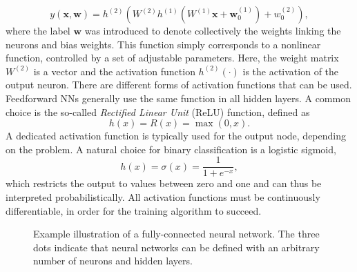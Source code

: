 \begin{equation}
    y(\pmb{x}, \pmb{w}) = h^{(2)} \left( W^{(2)} h^{(1)} \left(  W^{(1)} \pmb{x} + \pmb{w}^{(1)}_{0}    \right) + w^{(2)}_{0} \right),
\end{equation}
where the label $\pmb{w}$ was introduced to denote collectively the weights linking the neurons and bias weights.
This function simply corresponds to a nonlinear function, controlled by a set of adjustable parameters. Here, the weight matrix $W^{(2)}$ is a vector and the activation function $h^{(2)}(\cdot)$ is the activation of the output neuron.
There are different forms of activation functions that can be used.
Feedforward NNs generally use the same function in all hidden layers.
A common choice is the so-called \emph{Rectified Linear Unit} (ReLU) function, defined as
\begin{equation}
    {h(x)= R(x) = \max(0,x)}.    
\end{equation}
A dedicated activation function is typically used for the output node, depending on the problem.
A natural choice for binary classification is a logistic sigmoid,
\begin{equation}
    \label{eq:logistic-sigmoid}
    h(x)= \sigma(x) = {\frac {1}{1+e^{-x}}},
\end{equation}
which restricts the output to values between zero and one and can thus be interpreted probabilistically.
All activation functions must be continuously differentiable, in order for the training algorithm to succeed.






\begin{figure}[t]
    \caption{Example illustration of a fully-connected neural network. The three dots indicate that neural networks can be defined with an arbitrary number of neurons and hidden layers.}
    \label{fig:neural-net}
\end{figure}


